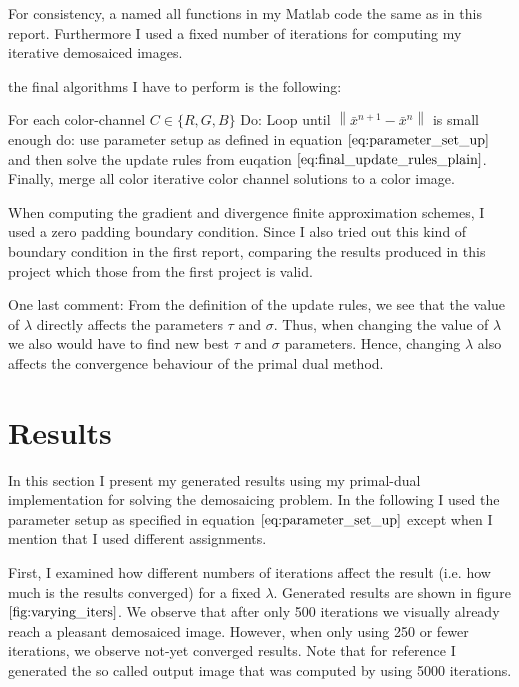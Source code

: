 \documentclass{paper}
\newcommand{\norm}[1]{\left\lVert#1\right\rVert}
\begin{document}
For consistency, a named all functions in my Matlab code the same as in this report. Furthermore I used a fixed number of iterations for computing my iterative demosaiced images.

the final algorithms I have to perform is the following:

For each color-channel $C \in \{R,G,B\}$ Do: Loop until $\norm{\bar{x}^{n+1} - \bar{x}^{n}}$ is small enough do: use parameter setup as defined in equation $\ref{eq:parameter_set_up}$ and then solve the update rules from euqation $\ref{eq:final_update_rules_plain}$. Finally, merge all color iterative color channel solutions to a color image.

When computing the gradient and divergence finite approximation schemes, I used a zero padding boundary condition. Since I also tried out this kind of boundary condition in the first report, comparing the results produced in this project which those from the first project is valid.

One last comment: From the definition of the update rules, we see that the value of $\lambda$ directly affects the parameters $\tau$ and $\sigma$. Thus, when changing the value of $\lambda$ we also would have to find new best $\tau$ and $\sigma$ parameters. Hence, changing $\lambda$ also affects the convergence behaviour of the primal dual method. 

\section{Results}

In this section I present my generated results using my primal-dual implementation for solving the demosaicing problem.
In the following I used the parameter setup as specified in equation $\ref{eq:parameter_set_up}	$ except when I mention that I used different assignments.

First, I examined how different numbers of iterations affect the result (i.e. how much is the results converged) for a fixed $\lambda$. Generated results are shown in figure $\ref{fig:varying_iters}$. We observe that after only 500 iterations we visually already reach a pleasant demosaiced image. However, when only using 250 or fewer iterations, we observe not-yet converged results. Note that for reference I generated the so called output image that was computed by using 5000 iterations.
\end{document}
